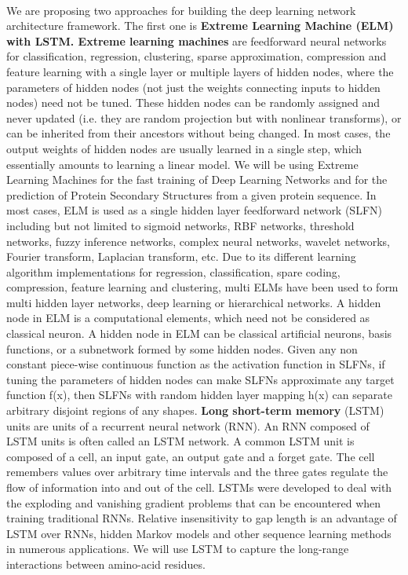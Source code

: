 \documentclass[12pt]{article}
\numberwithin{figure}{section}
\begin{document}
\paragraph{}
We are proposing two approaches for building the deep learning network architecture framework. The first one is \textbf{Extreme Learning Machine (ELM) with LSTM. Extreme learning machines} \cite{8,9} are feedforward neural networks for classification, regression, clustering, sparse approximation, compression and feature learning with a single layer or multiple layers of hidden nodes, where the parameters of hidden nodes (not just the weights connecting inputs to hidden nodes) need not be tuned. These hidden nodes can be randomly assigned and never updated (i.e. they are random projection but with nonlinear transforms), or can be inherited from their ancestors without being changed. In most cases, the output weights of hidden nodes are usually learned in a single step, which essentially amounts to learning a linear model. We will be using Extreme Learning Machines for the fast training of Deep Learning Networks and for the prediction of Protein Secondary Structures from a given protein sequence. In most cases, ELM is used as a single hidden layer feedforward network (SLFN) including but not limited to sigmoid networks, RBF networks, threshold networks, fuzzy inference networks, complex neural networks, wavelet networks, Fourier transform, Laplacian transform, etc. Due to its different learning algorithm implementations for regression, classification, spare coding, compression, feature learning and clustering, multi ELMs have been used to form multi hidden layer networks, deep learning or hierarchical networks. A hidden node in ELM is a computational elements, which need not be considered as classical neuron. A hidden node in ELM can be classical artificial neurons, basis functions, or a subnetwork formed by some hidden nodes. Given any non constant piece-wise continuous function as the activation function in SLFNs, if tuning the parameters of hidden nodes can make SLFNs approximate any target function f(x), then SLFNs with random hidden layer mapping h(x) can separate arbitrary disjoint regions of any shapes. \textbf{Long short-term memory} (LSTM) units are units of a recurrent neural network (RNN). An RNN composed of LSTM units is often called an LSTM network. A common LSTM unit is composed of a cell, an input gate, an output gate and a forget gate. The cell remembers values over arbitrary time intervals and the three gates regulate the flow of information into and out of the cell. LSTMs were developed to deal with the exploding and vanishing gradient problems that can be encountered when training traditional RNNs. Relative insensitivity to gap length is an advantage of LSTM over RNNs, hidden Markov models and other sequence learning methods in numerous applications. We will use LSTM to capture the long-range interactions between amino-acid residues.
\end{document}
